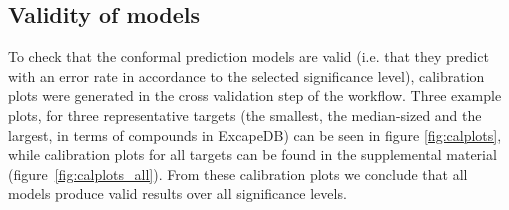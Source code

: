 \documentclass[utf8]{frontiersSCNS} %
\begin{document}
\subsection*{Validity of models}
To check that the conformal prediction models are valid (i.e. that they predict with
an error rate in accordance to the selected significance level), calibration plots
were generated in the cross validation step of the workflow. Three example
plots, for three representative targets (the smallest, the median-sized and the
largest, in terms of compounds in ExcapeDB) can be seen in figure
\ref{fig:calplots}, while calibration plots for all targets can be
found in the supplemental material (figure~\ref{fig:calplots_all}).
From these calibration plots we conclude that all models produce valid results over all
significance levels.
\end{document}
